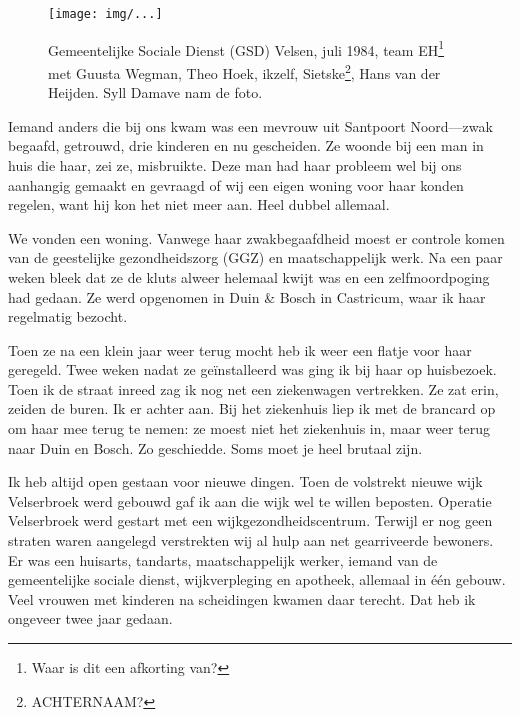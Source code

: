 \documentclass[12pt,twoside]{memoir}
\begin{document}


\begin{figure}[t]
\texttt{[image: img/...]}
\caption{Gemeentelijke Sociale Dienst (GSD) Velsen, juli 1984, team EH\footnote{Waar is dit een afkorting van?} met Guusta Wegman, Theo Hoek, ikzelf, Sietske\footnote{ACHTERNAAM?}, Hans van der Heijden. Syll Damave nam de foto.}
\end{figure}

Iemand anders die bij ons kwam was een mevrouw uit Santpoort Noord---zwak begaafd, getrouwd, drie kinderen en nu gescheiden. Ze woonde bij een man in huis die haar, zei ze, misbruikte. Deze man had haar probleem wel bij ons aanhangig gemaakt en gevraagd of wij een eigen woning voor haar konden regelen, want hij kon het niet meer aan. Heel dubbel allemaal. 

We vonden een woning. Vanwege haar zwakbegaafdheid moest er controle komen van de geestelijke gezondheidszorg (GGZ) en maatschappelijk werk. Na een paar weken bleek dat ze de kluts alweer helemaal kwijt was en een zelfmoordpoging had gedaan. Ze werd opgenomen in Duin \& Bosch in Castricum, waar ik haar regelmatig bezocht. 

Toen ze na een klein jaar weer terug mocht heb ik weer een flatje voor haar geregeld. Twee weken nadat ze geïnstalleerd was ging ik bij haar op huisbezoek. Toen ik de straat inreed zag ik nog net een ziekenwagen vertrekken. Ze zat erin, zeiden de buren. Ik er achter aan. Bij het ziekenhuis liep ik met de brancard op om haar mee terug te nemen: ze moest niet het ziekenhuis in, maar weer terug naar Duin en Bosch. Zo geschiedde. Soms moet je heel brutaal zijn.

Ik heb altijd open gestaan voor nieuwe dingen. Toen de volstrekt nieuwe wijk Velserbroek werd gebouwd gaf ik aan die wijk wel te willen beposten. Operatie Velserbroek werd gestart met een wijkgezondheidscentrum. Terwijl er nog geen straten waren aangelegd verstrekten wij al hulp aan net gearriveerde bewoners. Er was een huisarts, tandarts, maatschappelijk werker, iemand van de gemeentelijke sociale dienst, wijkverpleging en apotheek, allemaal in één gebouw. Veel vrouwen met kinderen na scheidingen kwamen daar terecht. Dat heb ik ongeveer twee jaar gedaan. 
\end{document}
